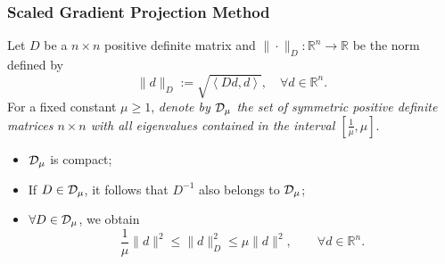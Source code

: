 \begin{frame}
  \frametitle{Scaled Gradient Projection Method}
  Let  $D$ be a $n\times n$ positive definite matrix and $\| \cdot \|_{D} : \mathbb{R}^{n}\rightarrow \mathbb{R}$ be  the norm  defined by
  \begin{equation*}
    \|d\|_{D}:=\sqrt{\left\langle D d,d\right\rangle},\quad \forall d\in \mathbb{R}^{n}.
  \end{equation*}
  For a fixed  constant $\mu \geq 1$,  {\it denote by  ${\cal D}_{\mu}$  the set of symmetric positive definite matrices $n\times n$ with all eigenvalues contained in the interval $[\frac{1}{\mu}, \mu]$}.
  \begin{itemize}
    \item ${\cal D}_{\mu}$   is compact;
    \item If $D\in {\cal D}_{\mu}$, it follows that $D^{-1}$ also belongs to $ {\cal D}_{\mu}$;
    \item $\forall D\in {\cal D}_{\mu}$,  we obtain
          \begin{equation*}
            \frac{1}{\mu}\|d\|^2\leq \|d\|^2_{D}\leq \mu \|d\|^2, \qquad \forall d\in \mathbb{R}^n.
          \end{equation*}
  \end{itemize}
\end{frame}







